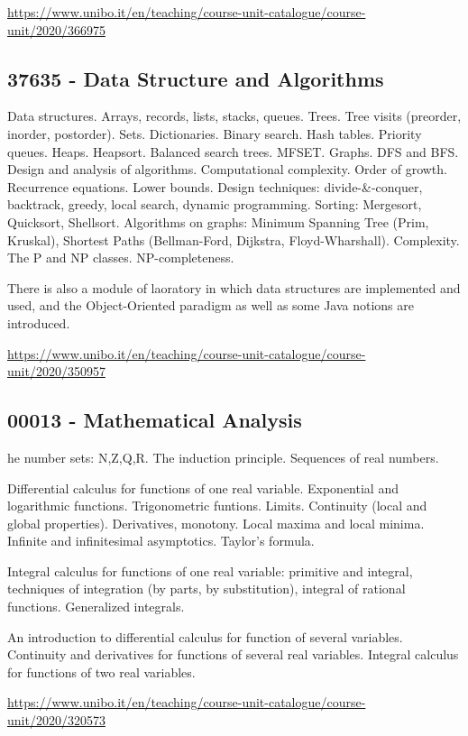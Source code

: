 \documentclass{article}
\begin{document}
\url{https://www.unibo.it/en/teaching/course-unit-catalogue/course-unit/2020/366975}

\subsection{37635 - Data Structure and Algorithms}

Data structures. Arrays, records, lists, stacks, queues. Trees. Tree visits (preorder, inorder, postorder). Sets. Dictionaries. Binary search. Hash tables. Priority queues. Heaps. Heapsort. Balanced search trees. MFSET. Graphs. DFS and BFS. Design and analysis of algorithms. Computational complexity. Order of growth. Recurrence equations. Lower bounds. Design techniques: divide-\&-conquer, backtrack, greedy, local search, dynamic programming. Sorting: Mergesort, Quicksort, Shellsort. Algorithms on graphs: Minimum Spanning Tree (Prim, Kruskal), Shortest Paths (Bellman-Ford, Dijkstra, Floyd-Wharshall). Complexity. The P and NP classes. NP-completeness.

There is also a module of laoratory in which data structures are implemented and used, and the Object-Oriented paradigm as well as some Java notions are introduced.


\url{https://www.unibo.it/en/teaching/course-unit-catalogue/course-unit/2020/350957}

\subsection{00013 - Mathematical Analysis}

he number sets: N,Z,Q,R.
The induction principle.
Sequences of real numbers.

Differential calculus for functions of one real variable.
Exponential and logarithmic functions. Trigonometric funtions.
Limits. Continuity (local and global properties).
Derivatives, monotony. Local maxima and local minima.
Infinite and infinitesimal asymptotics. Taylor's formula.

Integral calculus for functions of one real variable: primitive and integral, techniques of integration (by parts, by substitution), integral of rational functions. Generalized integrals.

An introduction to differential calculus for function of several variables. Continuity and derivatives for functions of several real variables.
Integral calculus for functions of two real variables.

\url{https://www.unibo.it/en/teaching/course-unit-catalogue/course-unit/2020/320573}
\end{document}
